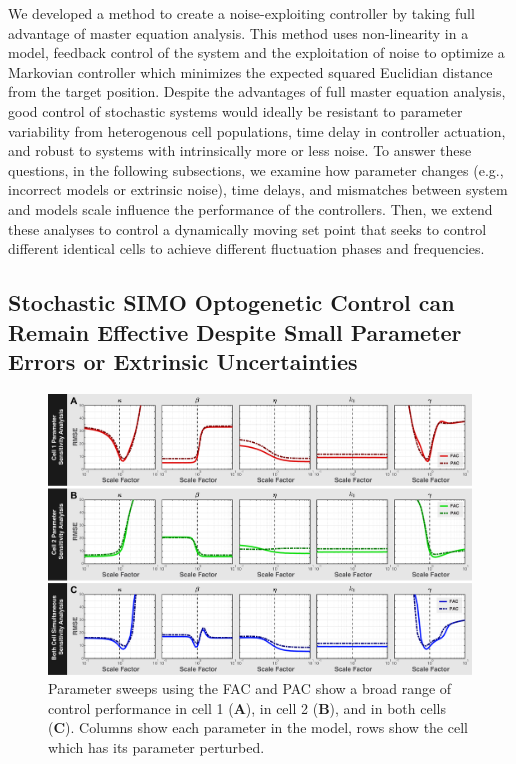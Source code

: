 \documentclass[12pt]{iopart}
\begin{document}

We developed a method to create a noise-exploiting controller by taking full advantage of master equation analysis. This method uses non-linearity in a model, feedback control of the system and the exploitation of noise to optimize a Markovian controller which minimizes the expected squared Euclidian distance from the target position. Despite the advantages of full master equation analysis, good control of stochastic systems would ideally be resistant to parameter variability from heterogenous cell populations, time delay in controller actuation, and robust to systems with intrinsically more or less noise. To answer these questions, in the following subsections, we examine how parameter changes (e.g., incorrect models or extrinsic noise), time delays, and mismatches between system and models scale influence the performance of the controllers.
Then, we extend these analyses to control a dynamically moving set point that seeks to control different identical cells to achieve different fluctuation phases and frequencies. 

\subsection{Stochastic SIMO Optogenetic Control can Remain Effective Despite Small Parameter Errors or Extrinsic Uncertainties}
\begin{figure}
\begin{center}
\includegraphics[width=1\textwidth]{ParameterPerturbation.pdf}
\caption{Parameter sweeps using the FAC and PAC show a broad range of control performance in cell 1 ({\bf A}),  in cell 2 ({\bf B}), and in both cells ({\bf C}). Columns show each parameter in the model, rows show the cell which has its parameter perturbed. }
\label{Parameter}
\end{center}
\end{figure}
\end{document}
